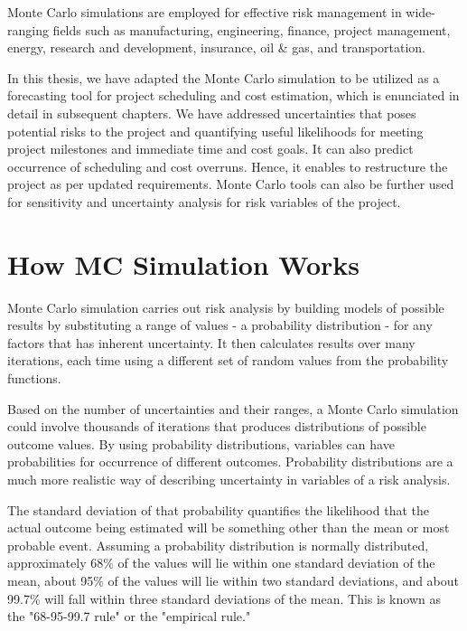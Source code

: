 Monte Carlo simulations are employed for effective risk management in wide-ranging fields such as manufacturing, engineering, finance, project management, energy, research and development, insurance, oil \& gas, and transportation. 

In this thesis, we have adapted the Monte Carlo simulation to be utilized as a forecasting tool for project scheduling and cost estimation, which is enunciated in detail in subsequent chapters. We have addressed uncertainties that poses potential risks to the project and quantifying useful likelihoods for meeting project milestones and immediate time and cost goals. It can also predict occurrence of scheduling and cost overruns. Hence, it enables to restructure the project as per updated requirements. Monte Carlo tools can also be further used for sensitivity and uncertainty analysis for risk variables of the project. 

\section{How MC Simulation Works}

Monte Carlo simulation carries out risk analysis by building models of possible results by substituting a range of values - a probability distribution - for any factors that has inherent uncertainty. It then calculates results over many iterations, each time using a different set of random values from the probability functions. 

Based on the number of uncertainties and their ranges, a Monte Carlo simulation could involve thousands of iterations that produces distributions of possible outcome values. By using probability distributions, variables can have probabilities for occurrence of different outcomes. Probability distributions are a much more realistic way of describing uncertainty in variables of a risk analysis.

The standard deviation of that probability quantifies the likelihood that the actual outcome being estimated will be something other than the mean or most probable event. Assuming a probability distribution is normally distributed, approximately 68\% of the values will lie within one standard deviation of the mean, about 95\% of the values will lie within two standard deviations, and about 99.7\% will fall within three standard deviations of the mean. This is known as the "68-95-99.7 rule" or the "empirical rule."

